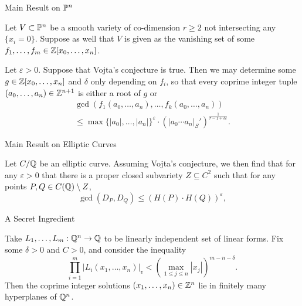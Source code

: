 \documentclass{beamer}
\begin{document}
\begin{frame}{Main Result on $\mathbb{P}^n$}
    \begin{theorem}
        Let $V \subset \mathbb{P}^n$ be a smooth variety of co-dimension $r \geq 2$ not intersecting any $\{x_i = 0\}$.
        Suppose as well that $V$ is given as the vanishing set of some $f_1, \ldots, f_m \in \mathbb{Z}[x_0, \ldots, x_n]$.
        
        Let $\varepsilon > 0$.
        Suppose that Vojta's conjecture is true.
        Then we may determine some $g \in \mathbb{Z}[x_0, \ldots, x_n]$ and $\delta$ only depending on $f_i$, 
        so that every coprime integer tuple $(a_0, \ldots, a_n) \in \mathbb{Z}^{n + 1}$ is either a root of $g$ or
        \begin{multline*}
            \gcd(f_1(a_0, \ldots, a_n), \ldots, f_k(a_0, \ldots, a_n)) \\
                \leq \max\{|a_0|, \ldots, |a_n|\}^\varepsilon
                    \cdot (|a_0 \cdots a_n|_S')^{\frac{1}{r - 1 + \delta \varepsilon}}.
        \end{multline*}
        
    \end{theorem}
\end{frame}

\begin{frame}{Main Result on Elliptic Curves}
    \begin{theorem}
        Let $C/ \mathbb{Q}$ be an elliptic curve.
        Assuming Vojta's conjecture,
        we then find that for any $\varepsilon > 0$ that there is a proper closed subvariety $Z \subseteq C^2$ such that for any points $P, Q \in C(\mathbb{Q}) \setminus Z$,
        \[
            \gcd(D_P, D_Q) \leq (H(P) \cdot H(Q))^\varepsilon,
        \]
    \end{theorem}
\end{frame}

\begin{frame}{A Secret Ingredient}

    \begin{theorem}
        Take $L_1, \ldots, L_m: \mathbb{Q}^n \to \mathbb{Q}$ to be linearly independent set of linear forms.
        Fix some $\delta > 0$ and $C > 0$, 
        and consider the inequality
        \[
            \prod_{i = 1}^m |L_i(x_1, \ldots, x_n)|_v < (\max_{1 \leq j \leq n} |x_j|)^{m - n - \delta}.
        \]
        Then the coprime integer solutions $(x_1, \ldots, x_n) \in \mathbb{Z}^n$ lie in finitely many hyperplanes of $\mathbb{Q}^n$.
    \end{theorem}

\end{frame}
\end{document}
